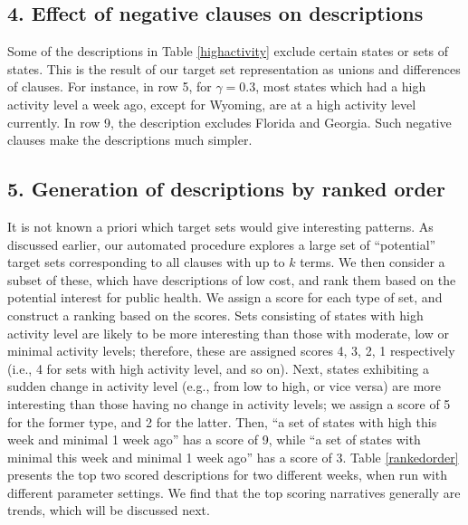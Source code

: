 \subsection*{4. Effect of negative clauses on descriptions}
Some of the descriptions in Table \ref{highactivity} exclude certain states or sets of states. 
This is the result of our target set representation as unions and differences of clauses. 
For instance, in row 5, for $\gamma=0.3$, most states which had a high activity level 
a week ago, except for Wyoming, are at a high activity level currently.
In row 9, the description excludes Florida and Georgia. Such negative clauses
make the descriptions much simpler.




\subsection*{5. Generation of descriptions by ranked order}
It is not known a priori which target sets would give interesting patterns.
As discussed earlier, our automated procedure explores a large set of ``potential'' target sets
corresponding to all clauses with up to $k$ terms. We then consider a subset of these, which have
descriptions of low cost, and rank them based on the potential interest for public health.
We assign a score for each type of set, and construct a ranking based on the scores.
Sets consisting of states with high activity level are likely to be more interesting
than those with moderate, low or minimal activity levels;
therefore, these are assigned scores 4, 3, 2, 1 respectively (i.e., 4 for sets with 
high activity level, and so on).
Next, states exhibiting a sudden change in activity level (e.g., from low to high, or vice versa)
are more interesting than those having no change in activity levels;
we assign a score of 5 for the former type, and 2 for the latter.
Then, ``a set of states with high this week and minimal 1 week ago'' has a score of 9, 
while ``a set of states with minimal this week and minimal 1 week ago'' has a score of 3. 
Table \ref{rankedorder} presents the top two scored descriptions for two different weeks,
when run with different parameter settings. 
We find that the top scoring narratives generally are trends, which will be discussed next.



